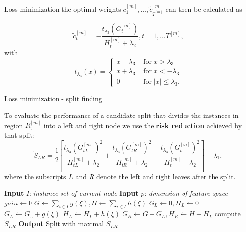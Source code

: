 \begin{vbframe}{Loss minimization}
the optimal weights $\tilde{c}^{[m]}_1,\dots, \tilde{c}^{[m]}_{T^{[m]}}$ can then be calculated as

\lz
$$
\tilde{c}^{[m]}_t = - \frac{t_\lambda_3\left(G^{[m]}_t\right)}{H^{[m]}_t + \lambda_2}, t=1,\dots T^{[m]},
$$
with $$t_\lambda_3(x) = \begin{cases}
  x - \lambda_3 &\text{ for } x > \lambda_3 \\
  x + \lambda_3 &\text{ for } x < - \lambda_3 \\
  0  &\text{ for } |x| \leq \lambda_3.
\end{cases}$$

\end{vbframe}

\begin{vbframe}{Loss minimization - split finding}

To evaluate the performance of a candidate split that divides the instances in region $R_t^{[m]}$ into a left and right node we use the \textbf{risk reduction} achieved by that split:
$$
\tilde S_{LR} =
 \frac12 \left[\frac{t_\lambda_3\left(G^{[m]}_{tL}\right)^2}{H^{[m]}_{tL} + \lambda_2} + \frac{t_\lambda_3\left(G^{[m]}_{tR}\right)^2}{H^{[m]}_{tR} + \lambda_2} - \frac{t_\lambda_3\left(G^{[m]}_{t}\right)^2}{H^{[m]}_{t} + \lambda_2}\right] - \lambda_1,
$$
where the subscripts $L$ and $R$ denote the left and right leaves after the split.


\lz

\framebreak

\begin{algorithm}[H]

\begin{footnotesize}
\begin{center}

  \begin{algorithmic}[1]
    \State \textbf{Input} $I$: \emph{instance set of current node}
    \State \textbf{Input} $p$: \emph{dimension of feature space}
    \State $gain \gets 0$
    \State $G \gets \sum_{i \in I} g(\xi), {H} \gets \sum_{i \in I} h(\xi)$
      \State $G_L \gets 0, {H}_L \gets 0$
        \State ${G}_L \gets {G}_L + g(\xi), {H}_L \gets {H}_L + h(\xi)$
        \State ${G}_R \gets G - {G}_L, {H}_R \gets {H} - {H}_L$
        \State compute $\tilde S_{LR}$
      \EndFor
    \EndFor
    \State \textbf{Output} Split with maximal $\tilde S_{LR}$
  \end{algorithmic}
\end{center}
\end{footnotesize}
\caption{(Exact) Algorithm for split finding}
\end{algorithm}

\end{vbframe}

